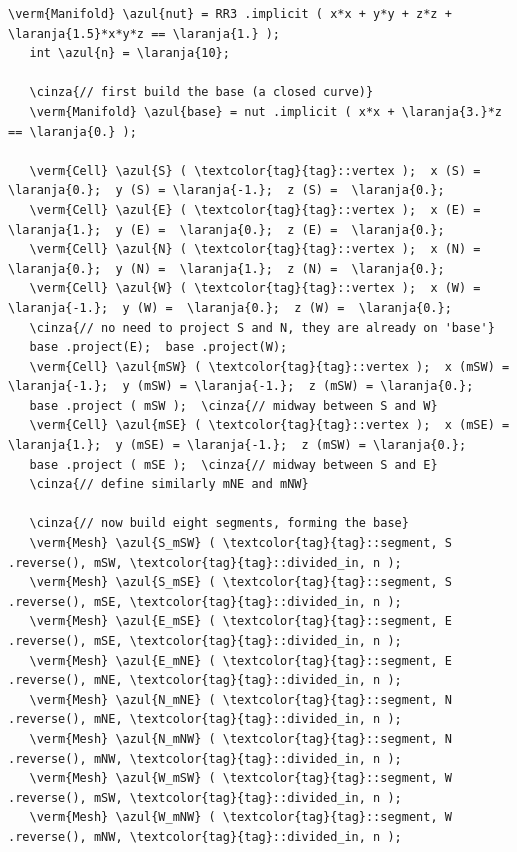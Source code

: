\begin{Verbatim}[commandchars=\\\{\},formatcom=\small\tt,frame=single,
   label=parag-\ref{\numb section 2.\numb parag 13}.cpp,rulecolor=\color{coment},
   baselinestretch=0.94,framesep=2mm]
   \verm{Manifold} \azul{nut} = RR3 .implicit ( x*x + y*y + z*z + \laranja{1.5}*x*y*z == \laranja{1.} );
   int \azul{n} = \laranja{10};

   \cinza{// first build the base (a closed curve)}
   \verm{Manifold} \azul{base} = nut .implicit ( x*x + \laranja{3.}*z == \laranja{0.} );

   \verm{Cell} \azul{S} ( \textcolor{tag}{tag}::vertex );  x (S) =  \laranja{0.};  y (S) = \laranja{-1.};  z (S) =  \laranja{0.};
   \verm{Cell} \azul{E} ( \textcolor{tag}{tag}::vertex );  x (E) =  \laranja{1.};  y (E) =  \laranja{0.};  z (E) =  \laranja{0.};
   \verm{Cell} \azul{N} ( \textcolor{tag}{tag}::vertex );  x (N) =  \laranja{0.};  y (N) =  \laranja{1.};  z (N) =  \laranja{0.};
   \verm{Cell} \azul{W} ( \textcolor{tag}{tag}::vertex );  x (W) = \laranja{-1.};  y (W) =  \laranja{0.};  z (W) =  \laranja{0.};
   \cinza{// no need to project S and N, they are already on 'base'}
   base .project(E);  base .project(W);
   \verm{Cell} \azul{mSW} ( \textcolor{tag}{tag}::vertex );  x (mSW) = \laranja{-1.};  y (mSW) = \laranja{-1.};  z (mSW) = \laranja{0.};
   base .project ( mSW );  \cinza{// midway between S and W}
   \verm{Cell} \azul{mSE} ( \textcolor{tag}{tag}::vertex );  x (mSE) =  \laranja{1.};  y (mSE) = \laranja{-1.};  z (mSW) = \laranja{0.};
   base .project ( mSE );  \cinza{// midway between S and E}
   \cinza{// define similarly mNE and mNW}

   \cinza{// now build eight segments, forming the base}
   \verm{Mesh} \azul{S_mSW} ( \textcolor{tag}{tag}::segment, S .reverse(), mSW, \textcolor{tag}{tag}::divided_in, n );
   \verm{Mesh} \azul{S_mSE} ( \textcolor{tag}{tag}::segment, S .reverse(), mSE, \textcolor{tag}{tag}::divided_in, n );
   \verm{Mesh} \azul{E_mSE} ( \textcolor{tag}{tag}::segment, E .reverse(), mSE, \textcolor{tag}{tag}::divided_in, n );
   \verm{Mesh} \azul{E_mNE} ( \textcolor{tag}{tag}::segment, E .reverse(), mNE, \textcolor{tag}{tag}::divided_in, n );
   \verm{Mesh} \azul{N_mNE} ( \textcolor{tag}{tag}::segment, N .reverse(), mNE, \textcolor{tag}{tag}::divided_in, n );
   \verm{Mesh} \azul{N_mNW} ( \textcolor{tag}{tag}::segment, N .reverse(), mNW, \textcolor{tag}{tag}::divided_in, n );
   \verm{Mesh} \azul{W_mSW} ( \textcolor{tag}{tag}::segment, W .reverse(), mSW, \textcolor{tag}{tag}::divided_in, n );
   \verm{Mesh} \azul{W_mNW} ( \textcolor{tag}{tag}::segment, W .reverse(), mNW, \textcolor{tag}{tag}::divided_in, n );


\end{Verbatim}
